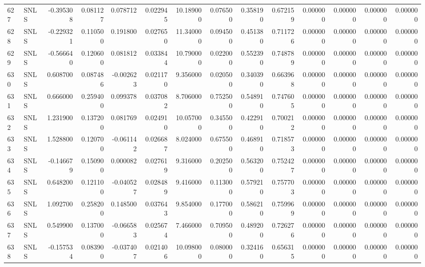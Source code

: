 \begin{tabular}{llrrrrrrrrrrrr}
627 &   SNLS & -0.395308 &      0.081127 &  0.078712 &    0.022945 &  10.189000 &      0.076500 &   0.358190 &  0.672159 &  0.000000 &   0.000000 &     0.000000 &     0.000000 \\
628 &   SNLS & -0.229321 &      0.110500 &  0.191800 &    0.027650 &  11.340000 &      0.094500 &   0.451380 &  0.711726 &  0.000000 &   0.000000 &     0.000000 &     0.000000 \\
629 &   SNLS & -0.566640 &      0.120600 &  0.081812 &    0.033844 &  10.790000 &      0.022000 &   0.552390 &  0.748789 &  0.000000 &   0.000000 &     0.000000 &     0.000000 \\
630 &   SNLS &  0.608700 &      0.087486 & -0.002623 &    0.021170 &   9.356000 &      0.020500 &   0.340390 &  0.663968 &  0.000000 &   0.000000 &     0.000000 &     0.000000 \\
631 &   SNLS &  0.666000 &      0.259400 &  0.099378 &    0.037082 &   8.706000 &      0.752500 &   0.548910 &  0.747605 &  0.000000 &   0.000000 &     0.000000 &     0.000000 \\
632 &   SNLS &  1.231900 &      0.137200 &  0.081769 &    0.024910 &  10.057000 &      0.345500 &   0.422910 &  0.700212 &  0.000000 &   0.000000 &     0.000000 &     0.000000 \\
633 &   SNLS &  1.528800 &      0.120700 & -0.061142 &    0.026687 &   8.024000 &      0.675500 &   0.468910 &  0.718573 &  0.000000 &   0.000000 &     0.000000 &     0.000000 \\
634 &   SNLS & -0.146679 &      0.150900 &  0.000082 &    0.027619 &   9.316000 &      0.202500 &   0.563200 &  0.752427 &  0.000000 &   0.000000 &     0.000000 &     0.000000 \\
635 &   SNLS &  0.648200 &      0.121100 & -0.040527 &    0.028489 &   9.416000 &      0.113000 &   0.579210 &  0.757703 &  0.000000 &   0.000000 &     0.000000 &     0.000000 \\
636 &   SNLS &  1.092700 &      0.258200 &  0.148500 &    0.037643 &   9.854000 &      0.177000 &   0.586210 &  0.759969 &  0.000000 &   0.000000 &     0.000000 &     0.000000 \\
637 &   SNLS &  0.549900 &      0.137000 & -0.066583 &    0.025674 &   7.466000 &      0.709500 &   0.489200 &  0.726276 &  0.000000 &   0.000000 &     0.000000 &     0.000000 \\
638 &   SNLS & -0.157534 &      0.083900 & -0.037407 &    0.021406 &  10.098000 &      0.080000 &   0.324160 &  0.656315 &  0.000000 &   0.000000 &     0.000000 &     0.000000 \\

\end{tabular}
